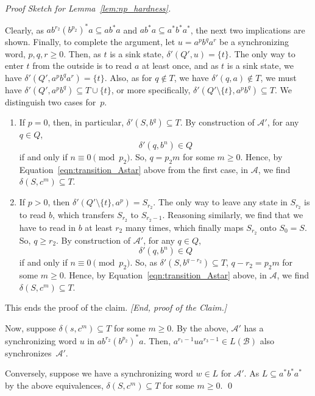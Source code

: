\begin{proof}[Proof Sketch for Lemma~\ref{lem:np_hardness}]
\begin{toappendix}
 Clearly, as $ab^{r_2}(b^{p_2})^*a \subseteq a b^* a$
 and $a b^* a \subseteq a^* b^* a^*$, the next two implications are shown.
 Finally, to complete the argument, let $u = a^{p} b^q a^r$ be a synchronizing word, $p,q,r \ge 0$.
 Then, as $t$ is a sink state, $\delta'(Q', u) = \{t\}$.
 The only way to enter $t$ from the outside is to read $a$ at least once, and 
 as $t$ is a sink state, we have $\delta'(Q', a^p b^q a^r) = \{t\}$.
 Also, as for $q \notin T$, we have $\delta'(q, a) \notin T$,
 we must have $\delta'(Q', a^p b^q) \subseteq T \cup \{t\}$,
  or more specifically, $\delta'(Q' \setminus \{t\}, a^p b^q) \subseteq T$.
  We distinguish two cases for~$p$.
 
 \begin{enumerate}
 \item If $p = 0$, then, in particular, $\delta'(S, b^q)  \subseteq T$.
     By construction of $\mathcal A'$, for any $q \in Q$,
 \[
  \delta'(q, b^n) \in Q
 \]
 if and only if $n \equiv 0\pmod{p_2}$.
 So, $q = p_2 m$ for some $m \ge 0$.
 Hence, by Equation~\eqref{eqn:transition_Astar} above from the first case, in $\mathcal A$,
 we find $\delta(S, c^m) \subseteq T$.
 
 \item  If $p > 0$, then $\delta'(Q' \setminus\{t\}, a^p) = S_{r_2}$.
 The only way to leave any state in $S_{r_2}$
 is to read $b$, which transfers $S_{r_2}$ to $S_{r_2-1}$.
 Reasoning similarly, we find that we have to read in $b$
 at least $r_2$ many times, which finally maps $S_{r_2}$
 onto $S_0 = S$. So, $q \ge r_2$. By construction of $\mathcal A'$, for any $q \in Q$,
 \[
  \delta'(q, b^n) \in Q
 \]
 if and only if $n \equiv 0\pmod{p_2}$.
 So, as $\delta'(S, b^{q - r_2}) \subseteq T$, $q - r_2 = p_2 m$ for some $m \ge 0$.
 Hence, by Equation~\eqref{eqn:transition_Astar} above, in $\mathcal A$,
 we find $\delta(S, c^m) \subseteq T$.
 \end{enumerate}
This ends the proof of the claim. \emph{[End, proof of the Claim.]}
\end{toappendix}

 Now, suppose $\delta(s, c^m) \subseteq T$ for some $m \ge 0$.
 By the above, $\mathcal A'$ 
 has a synchronizing word $u$ in $ab^{r_2}(b^{p_2})^*a$.
 Then, $a^{r_1 - 1}u a^{r_3-1} \in L(\mathcal B)$ also synchronizes~$\mathcal A'$.
 
 
 Conversely, suppose we have a synchronizing word $w \in L$
 for $\mathcal A'$.
 As $L \subseteq a^* b^* a^*$
 by the above equivalences,
 $\delta(S, c^m) \subseteq T$
 for some $m \ge 0$. \qed
\end{proof}
